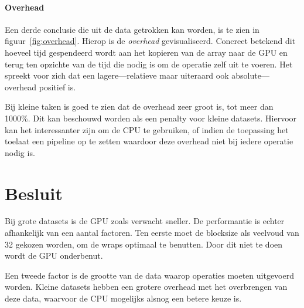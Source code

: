 \documentclass[twocolumn, a4paper]{article}
\begin{document}
\paragraph{Overhead}
Een derde conclusie die uit de data getrokken kan worden, is te zien in figuur~\ref{fig:overhead}. Hierop is de \emph{overhead} gevisualiseerd. Concreet betekend dit hoeveel tijd gespendeerd wordt aan het kopieren van de array naar de GPU en terug ten opzichte van de tijd die nodig is om de operatie zelf uit te voeren. Het spreekt voor zich dat een lagere---relatieve maar uiteraard ook absolute---overhead positief is. 

Bij kleine taken is goed te zien dat de overhead zeer groot is, tot meer dan 1000\%. Dit kan beschouwd worden als een penalty voor kleine datasets. Hiervoor kan het interessanter zijn om de CPU te gebruiken, of indien de toepassing het toelaat een pipeline op te zetten waardoor deze overhead niet bij iedere operatie nodig is. 

\section{Besluit}
Bij grote datasets is de GPU zoals verwacht sneller. De performantie is echter afhankelijk van een aantal factoren. Ten eerste moet de blocksize als veelvoud van 32 gekozen worden, om de wraps optimaal te benutten. Door dit niet te doen wordt de GPU onderbenut.

Een tweede factor is de grootte van de data waarop operaties moeten uitgevoerd worden. Kleine datasets hebben een grotere overhead met het overbrengen van deze data, waarvoor de CPU mogelijks alsnog een betere keuze is.


\onecolumn

\appendix
\end{document}
